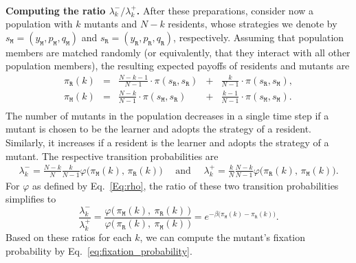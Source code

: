 \documentclass[11pt]{article}
\def\resident{\texttt{R}}
\def\mutant{\texttt{M}}
\def\strategy{s}
\theoremstyle{plainCl1}
\theoremstyle{plainCl2}
\begin{document}
~\\
\noindent
{\bf Computing the ratio $\lambda^-_k/\lambda^+_k$.}
After these preparations, consider now a population with \(k\) mutants and \(N - k\) residents, whose strategies we denote by \(\strategy_\mutant=(y_\mutant,p_\mutant, q_\mutant)\) and \(\strategy_\resident = (y_\resident, p_\resident, q_\resident)\), respectively.
Assuming that population members are matched randomly (or equivalently, that they interact with all other population members), the resulting expected payoffs of residents and mutants are
\begin{equation} \label{Eq:ExpPay}
  \begin{array}{lcrcr}
  \displaystyle \pi_\resident(k)& = &\displaystyle \frac{N\!-\!k\!-\!1}{N-1}\cdot \pi(\strategy_\resident,\strategy_\resident)	&+	&\displaystyle\frac{k}{N-1}\cdot \pi(\strategy_\resident,\strategy_\mutant),\\[0.5cm]
  \displaystyle \pi_\mutant(k)& = &\displaystyle\frac{N-k}{N-1}\cdot \pi(\strategy_\mutant,\strategy_\resident) &+	&\displaystyle\frac{k-1}{N-1}\cdot \pi(\strategy_\mutant,\strategy_\mutant).\\
  \end{array}
\end{equation}
The number of mutants in the population decreases in a single time step if a mutant is chosen to be the learner and adopts the strategy
of a resident. 
Similarly, it increases if a resident is the learner and adopts the strategy of a mutant. 
The respective transition probabilities are 
\begin{align*}
  \lambda^-_k \!=\! \frac{N-k}{N}\frac{k}{N-1}\varphi\big(\pi_\mutant(k),\,\pi_\resident(k)\big) \quad \text{ and } \quad \lambda^+_k \!=\!\frac{k}{N}\frac{N-k}{N-1}\varphi\big(\pi_\resident(k),\,\pi_\mutant(k)\big).
\end{align*}
For $\varphi$ as defined by Eq.~\eqref{Eq:rho}, the ratio of these two transition probabilities simplifies to 
\begin{equation} \label{eq:LambdaRatio}
 \frac{\lambda^-_k}{\lambda^+_k} \!=\!  \frac{\varphi\big(\,\pi_\mutant(k),~\pi_\resident(k)\,\big)}{\varphi\big(\,\pi_\resident(k),~\pi_\mutant(k)\,\big)} 
 =e^{-\beta\big(\pi_\mutant(k)-\pi_\resident(k)\big)}.
\end{equation}
Based on these ratios for each $k$, we can compute the mutant's fixation probability by Eq.~\eqref{eq:fixation_probability}. 

\end{document}
